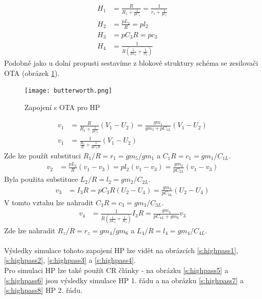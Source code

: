 \begin{align}
H_1 & = \frac{R}{R_z + \frac{1}{pC_1}} = \frac{1}{r_z + \frac{1}{pc_1}}\\
H_2 &= \frac{pL_2}{R} = pl_2\\
H_3 &= pC_3R = pc_3\\
H_4 &= \frac{1}{R(\frac{1}{pL_4} + \frac{1}{R_z})}
\end{align}
Podobně jako u dolní propusti sestavíme z blokové struktury schéma se zesilovači OTA (obrázek \ref{s:OTAHP}).
\begin{figure}[h]
\centering
\texttt{[image: butterworth.png]}
\caption{Zapojení s OTA pro HP \label{s:OTAHP}}
\end{figure}
\begin{align}
v_1 &= \frac{R}{R_1 + \frac{1}{pC_1}}(V_1 - U_2) = \frac{gm_1}{gm_5 + pC_{1L}}(V_1 - U_2)\\
v_1 &= \frac{1}{\frac{R_1}{R} + \frac{1}{pC_1R}}(V_1 - U_2)
\end{align}
Zde lze použít substituci $R_1/R = r_1 = gm_5/gm_1$ a $C_1R = c_1 = gm_1/C_{1L}$.
\begin{align}
v_2 &= \frac{pL_2}{R}(v_1 - v_3) = pl_2(v_1 - v_3) = \frac{gm_2}{pC_{2L}}(v_1 - v_3)
\end{align}
Byla použita substituce $L_2/R = l_2 = gm_2/C_{2L}$.
\begin{align}
v_3 &= I_3R = pC_3R(U_2 - U_4) = \frac{gm_3}{pC_{3L}}(U_2 - U_4)
\end{align}
V tomto vztahu lze nahradit $C_3R = c_3 = gm_3/C_{3L}$.
\begin{align}
v_4 &= \frac{1}{R(\frac{1}{pL_4} + \frac{1}{R_z})}I_3R = \frac{gm_4}{pC_{4L} + gm_6}v_3
\end{align}
Zde lze nahradit $R_z/R = r_z = gm_4/gm_6$ a $L_4/R = l_4 = gm_4/C_{4L}$.\\
\\
Výsledky simulace tohoto zapojení HP lze vidět na obrázcích \ref{s:highpass1}, \ref{s:highpass2}, \ref{s:highpass3} a \ref{s:highpass4}.\\
Pro simulaci HP lze také použít CR články - na obrázku \ref{s:highpass5} a \ref{s:highpass6} jsou výsledky simulace HP 1. řádu a na obrázku \ref{s:highpass7} a \ref{s:highpass8} HP 2. řádu.
